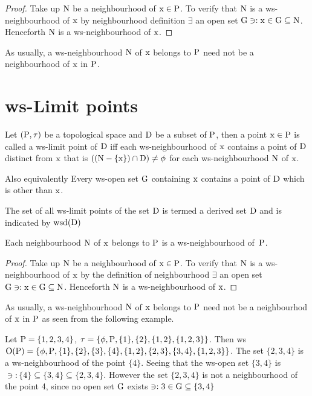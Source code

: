 \begin{proof}
Take up $\mathrm{N}$ be a neighbourhood of $\mathrm{x}\in \mathrm{P}$. To verify that $\mathrm{N}$ is a ws-neighbour\-hood of $\mathrm{x}$ by neighbourhood definition $\exists$ an open set $\mathrm{G} \ni: \mathrm{x}\in \mathrm{G}\subseteq \mathrm{N}$. Henceforth $\mathrm{N}$ is a ws-neighbourhood of $\mathrm{x}$.
\end{proof}

\begin{rem}\label{rem2.5.5} 
As usually, a ws-neighbourhood $\mathrm{N}$ of $\mathrm{x}$ belongs to $\mathrm{P}$ need not be a neighbourhood of $\mathrm{x}$ in $\mathrm{P}$.
\end{rem}

\section{ws-Limit points}\label{sec2.6}

\begin{dfn}\label{defi2.6.1}
Let $(\mathrm{P}, \tau)$ be a topological space and $\mathrm{D}$ be a subset of $\mathrm{P}$, then a point $\mathrm{x}\in \mathrm{P}$ is called a ws-limit point of $\mathrm{D}$ iff each ws-neighbourhood of $\mathrm{x}$ contains a point of $\mathrm{D}$ distinct from $\mathrm{x}$ that is $((\mathrm{N}-\{\mathrm{x}\})\cap \mathrm{D})\neq \phi$ for each ws-neighbourhood $\mathrm{N}$ of $\mathrm{x}$.
\end{dfn}

Also equivalently Every ws-open set $\mathrm{G}$ containing $\mathrm{x}$ contains a point of $\mathrm{D}$ which is other than $\mathrm{x}$.

\begin{dfn}\label{defi2.6.2}
The set of all ws-limit points of the set $\mathrm{D}$ is termed a derived set $\mathrm{D}$ and is indicated by $\mathrm{wsd}(\mathrm{D})$
\end{dfn}

\begin{thm}\label{thm2.6.3}
Each neighbourhood $\mathrm{N}$ of $\mathrm{x}$ belongs to $\mathrm{P}$ is a ws-neighbourhood of~$\mathrm{P}$.
\end{thm}

\begin{proof}
Take up $\mathrm{N}$ be a neighbourhood of $\mathrm{x}\in \mathrm{P}$. To verify that $\mathrm{N}$ is a ws-neighbour\-hood of $\mathrm{x}$ by the definition of neighbourhood $\exists$ an open set $\mathrm{G} \ni: \mathrm{x}\in\mathrm{G}\subseteq \mathrm{N}$. Henceforth $\mathrm{N}$ is a ws-neighbourhood of $\mathrm{x}$.
\end{proof}

\begin{rem}\label{rem2.6.4}
As usually, a ws-neighbourhood $\mathrm{N}$ of $\mathrm{x}$ belongs to $\mathrm{P}$ need not be a neighbourhod of $\mathrm{x}$ in $\mathrm{P}$ as seen from the following example.
\end{rem}

\begin{exm}\label{exam2.6.5}
Let $\mathrm{P} = \{1, 2, 3, 4 \}$, $\tau = \{\phi, \mathrm{P}, \{1\}, \{2\}, \{1, 2\}, \{1, 2, 3\}\}$. Then ws$\mathrm{O}(\mathrm{P})= \{\phi, \mathrm{P}, \{1\}, \{2\}, \{3\}, \{4\},\{1, 2\},\{2, 3\}, \{3, 4\}, \{1, 2, 3\}\}$. The set $\{2, 3, 4\}$ is a ws-neighbourhood of the point $\{4\}$. Seeing that the ws-open set $\{3, 4\}$ is $\ni: \{4\}\subseteq \{3, 4\} \subseteq \{2, 3, 4\}$. However the set $\{2, 3, 4\}$ is not a neighbourhood of the point 4, since no open set $\mathrm{G}$ exists $\ni: 3\in \mathrm{G}\subseteq \{3, 4\}$
\end{exm}
